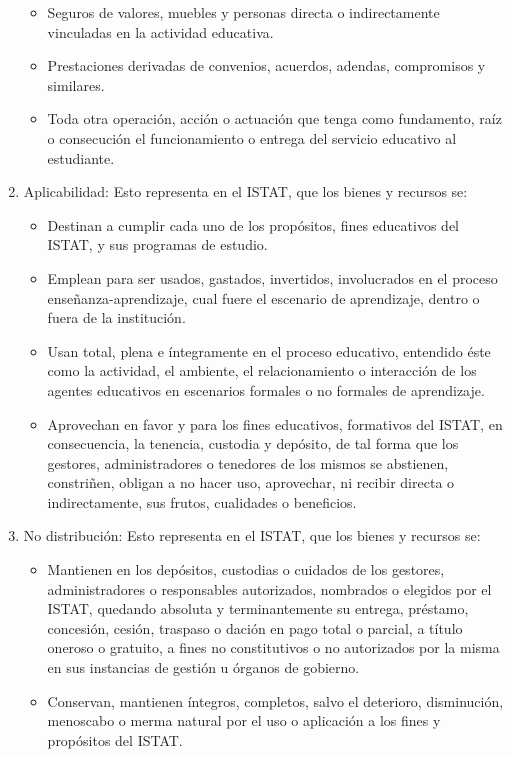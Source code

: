 \begin{enumerate}
\begin{itemize}
\item Seguros de valores, muebles y personas directa o indirectamente vinculadas en la actividad educativa. 
\item Prestaciones derivadas de convenios, acuerdos, adendas, compromisos y similares. 
\item Toda otra operación, acción o actuación que tenga como fundamento, raíz o consecución el funcionamiento o entrega del servicio educativo al estudiante. 
\end{itemize}
\item Aplicabilidad: Esto representa en el ISTAT, que los bienes y recursos se: 
\begin{itemize}
\item Destinan a cumplir cada uno de los propósitos, fines educativos del ISTAT, y sus programas de estudio. 
\item Emplean para ser usados, gastados, invertidos, involucrados en el proceso enseñanza-aprendizaje, cual fuere el escenario de aprendizaje, dentro o fuera de la institución. 
\item Usan total, plena e íntegramente en el proceso educativo, entendido éste como la actividad, el ambiente, el relacionamiento o interacción de los agentes educativos en escenarios formales o no formales de aprendizaje. 
\item Aprovechan en favor y para los fines educativos, formativos del ISTAT, en consecuencia, la tenencia, custodia y depósito, de tal forma que los gestores, administradores o tenedores de los mismos se abstienen, constriñen, obligan a no hacer uso, aprovechar, ni recibir directa o indirectamente, sus frutos, cualidades o beneficios. 
\end{itemize}
\item No distribución: Esto representa en el ISTAT, que los bienes y recursos se: 
\begin{itemize}
\item Mantienen en los depósitos, custodias o cuidados de los gestores, administradores o responsables autorizados, nombrados o elegidos por el ISTAT, quedando absoluta y terminantemente su entrega, préstamo, concesión, cesión, traspaso o dación en pago total o parcial, a título oneroso o gratuito, a fines no constitutivos o no autorizados por la misma en sus instancias de gestión u órganos de gobierno.  
\item Conservan, mantienen íntegros, completos, salvo el deterioro, disminución, menoscabo o merma natural por el uso o aplicación a los fines y propósitos del ISTAT. 

\end{itemize}
\end{enumerate}
